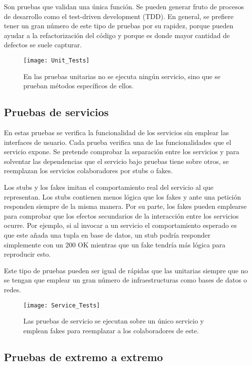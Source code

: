 \documentclass[11pt,a4paper]{article}
\begin{document}
Son pruebas que validan una única función. Se pueden generar fruto de procesos de desarrollo como el test-driven development (TDD). En general, se prefiere tener un gran número de este tipo de pruebas por su rapidez, porque pueden ayudar a la refactorización del código y porque es donde mayor cantidad de defectos se suele capturar.

\begin{figure}[H]
\centering
\texttt{[image: Unit\_Tests]}
\caption{En las pruebas unitarias no se ejecuta ningún servicio, sino que se prueban métodos específicos de ellos.}
\end{figure}

\subsection{Pruebas de servicios}

En estas pruebas se verifica la funcionalidad de los servicios sin emplear las interfaces de usuario. Cada prueba verifica una de las funcionalidades que el servicio expone. Se pretende comprobar la separación entre los servicios y para solventar las dependencias que el servicio bajo pruebas tiene sobre otros, se reemplazan los servicios colaboradores por stubs o fakes.

Los stubs y los fakes imitan el comportamiento real del servicio al que representan. Los stubs contienen menos lógica que los fakes y ante una petición responden siempre de la misma manera. Por su parte, los fakes pueden emplearse para comprobar que los efectos secundarios de la interacción entre los servicios ocurre. Por ejemplo, si al invocar a un servicio el comportamiento esperado es que este añada una tupla en base de datos, un stub podría responder simplemente con un 200 OK mientras que un fake tendría más lógica para reproducir esto.

Este tipo de pruebas pueden ser igual de rápidas que las unitarias siempre que no se tengan que emplear un gran número de infraestructuras como bases de datos o redes.

\begin{figure}[h]
\centering
\texttt{[image: Service\_Tests]}
\caption{Las pruebas de servicio se ejecutan sobre un único servicio y emplean fakes para reemplazar a los colaboradores de este.}
\end{figure}

\subsection{Pruebas de extremo a extremo}
\end{document}
